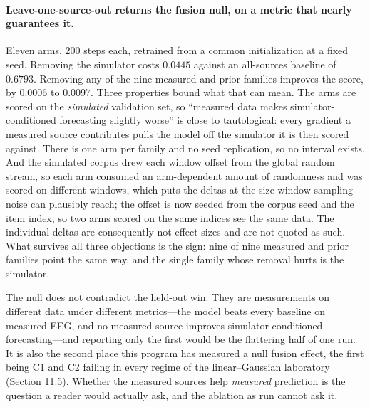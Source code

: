 \paragraph{Leave-one-source-out returns the fusion null, on a metric that nearly
guarantees it.} Eleven arms, 200 steps each, retrained from a common
initialization at a fixed seed. Removing the simulator costs \(0.0445\) against
an all-sources baseline of \(0.6793\). Removing any of the nine measured and
prior families improves the score, by \(0.0006\) to \(0.0097\). Three properties
bound what that can mean. The arms are scored on the \emph{simulated} validation
set, so ``measured data makes simulator-conditioned forecasting slightly worse''
is close to tautological: every gradient a measured source contributes pulls the
model off the simulator it is then scored against. There is one arm per family
and no seed replication, so no interval exists. And the simulated corpus drew
each window offset from the global random stream, so each arm consumed an
arm-dependent amount of randomness and was scored on different windows, which
puts the deltas at the size window-sampling noise can plausibly reach; the offset
is now seeded from the corpus seed and the item index, so two arms scored on the
same indices see the same data. The individual deltas are consequently not effect
sizes and are not quoted as such. What survives all three objections is the sign:
nine of nine measured and prior families point the same way, and the single
family whose removal hurts is the simulator.

The null does not contradict the held-out win. They are measurements on different
data under different metrics---the model beats every baseline on measured EEG,
and no measured source improves simulator-conditioned forecasting---and reporting
only the first would be the flattering half of one run. It is also the second
place this program has measured a null fusion effect, the first being C1 and C2
failing in every regime of the linear--Gaussian laboratory (Section 11.5).
Whether the measured sources help \emph{measured} prediction is the question a
reader would actually ask, and the ablation as run cannot ask it.

